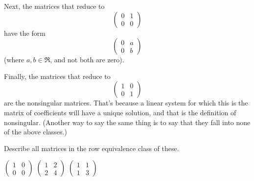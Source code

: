 \begin{exercises}
\begin{answer}
       Next, the matrices that reduce to 
       \begin{equation*}
         \begin{pmatrix}
           0  &1  \\
           0  &0
         \end{pmatrix}
       \end{equation*}
       have the form
       \begin{equation*}
         \begin{pmatrix}
           0  &a \\
           0  &b
         \end{pmatrix}
       \end{equation*}
       (where \( a,b\in\Re \), and not both are zero).  

       Finally, the matrices that reduce to 
       \begin{equation*}
         \begin{pmatrix}
           1  &0  \\
           0  &1
         \end{pmatrix}
       \end{equation*}
       are the nonsingular matrices.
       That's because a linear system for which this is the matrix of
       coefficients will have a unique solution, and that is the definition
       of nonsingular.
       (Another way to say the same thing is to say that they fall into none
       of the above classes.)
     \end{answer}
  \item 
    Describe all matrices in the row equivalence class of
    these.
    \begin{exparts*}
       \partsitem  \(
           \begin{pmatrix}
             1  &0  \\
             0  &0
           \end{pmatrix}  \)
       \partsitem  \(
           \begin{pmatrix}
             1  &2      \\
             2  &4
           \end{pmatrix} \)
       \partsitem \(
           \begin{pmatrix}
             1  &1      \\
             1  &3
           \end{pmatrix} \)
    \end{exparts*}
    \begin{answer}

\end{answer}
\end{exercises}
